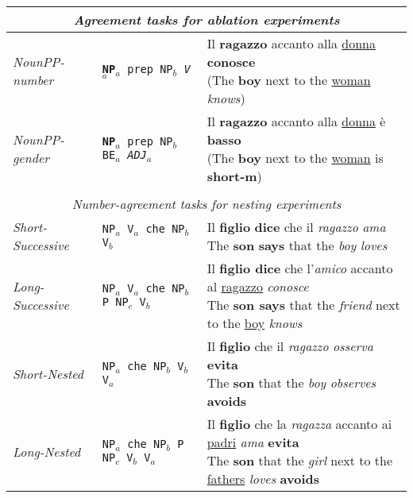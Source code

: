 \begin{table}[h]
    \setlength\tabcolsep{3mm}
\small
\centering
\begin{tabular}{lll}
\multicolumn{3}{c}{\centering \textit{Agreement tasks for ablation experiments}}\\
\hline
\hline
\emph{NounPP-number} & \texttt{\textbf{NP$_a$} prep NP$_b$ \emph{V$_a$}} & \specialcell{Il \textbf{ragazzo} accanto alla \underline{donna} \textbf{conosce}\vspace{-1mm}\\({\scriptsize The \textbf{boy} next to the \underline{woman} \emph{knows}})} \\
\emph{NounPP-gender} & \texttt{\textbf{NP$_a$} prep NP$_b$ BE$_a$ \emph{ADJ$_a$}} & \specialcell{Il \textbf{ragazzo} accanto alla \underline{donna} \`{e} \textbf{basso}\vspace{-1mm}\\({\scriptsize The \textbf{boy} next to the \underline{woman} is \textbf{short-m}})}\\
\vspace{-2mm}\\
\multicolumn{3}{c}{\centering \textit{Number-agreement tasks for nesting experiments}}\\
\hline
\hline
\emph{Short-Successive} & \texttt{NP$_a$ V$_a$ che NP$_b$ V$_b$} & \specialcell{Il \textbf{figlio} \textbf{dice} che il \emph{ragazzo} \emph{ama}\vspace{-1mm}\\{\scriptsize The \textbf{son} \textbf{says} that the \emph{boy} \emph{loves}}} \\
\emph{Long-Successive} & \texttt{NP$_a$ V$_a$ che NP$_b$ P NP$_c$ V$_b$} & \specialcell{Il \textbf{figlio dice} che l'\emph{amico} accanto al \underline{ragazzo} \emph{conosce}\vspace{-1mm}\\{\scriptsize The \textbf{son says} that the \emph{friend} next to the \underline{boy} \emph{knows}}} \\
\emph{Short-Nested} & \texttt{NP$_a$ che NP$_b$ V$_b$ V$_a$ } & \specialcell{Il \textbf{figlio} che il \emph{ragazzo} \emph{osserva} \textbf{evita}\vspace{-1mm}\\{\scriptsize The \textbf{son} that the \emph{boy} \emph{observes} \textbf{avoids}}} \\
\emph{Long-Nested} & \texttt{NP$_a$ che NP$_b$ P NP$_c$ V$_b$ V$_a$} & \specialcell{Il \textbf{figlio} che la \emph{ragazza} accanto ai \underline{padri} \emph{ama} \textbf{evita}\vspace{-1mm}\\{\scriptsize The \textbf{son} that the \emph{girl} next to the \underline{fathers} \emph{loves} \textbf{avoids}}} \\

\end{tabular}
\end{table}
